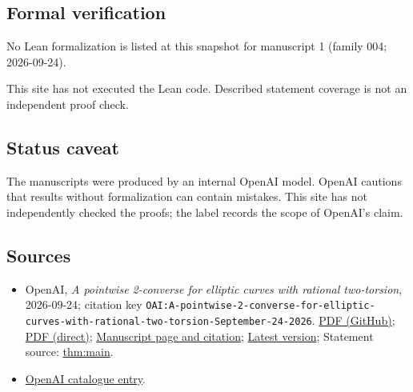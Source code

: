 \documentclass[11pt]{article}
\begin{document}
\subsection{Formal verification}
No Lean formalization is listed at this snapshot for manuscript 1 (family 004; 2026-09-24).

This site has not executed the Lean code. Described statement coverage is not an independent proof check.

\subsection{Status caveat}
The manuscripts were produced by an internal OpenAI model. OpenAI cautions that results without formalization can contain mistakes. This site has not independently checked the proofs; the label records the scope of OpenAI's claim.

\subsection{Sources}
\begin{itemize}
\item OpenAI, \emph{A pointwise 2-converse for elliptic curves with rational two-torsion}, 2026-09-24; citation key \texttt{OAI:A-pointwise-2-converse-for-elliptic-curves-with-rational-two-torsion-September-24-2026}. \href{https://github.com/openai/math/blob/adc7f1241b42e322a6451854ab7e4b4c146bf78a/preprints/A-pointwise-2-converse-for-elliptic-curves-with-rational-two-torsion-September-24-2026/paper.pdf}{PDF (GitHub)}; \href{https://github.com/openai/math/raw/adc7f1241b42e322a6451854ab7e4b4c146bf78a/preprints/A-pointwise-2-converse-for-elliptic-curves-with-rational-two-torsion-September-24-2026/paper.pdf}{PDF (direct)}; \href{https://github.com/openai/math/blob/adc7f1241b42e322a6451854ab7e4b4c146bf78a/preprints/A-pointwise-2-converse-for-elliptic-curves-with-rational-two-torsion-September-24-2026/README.md}{Manuscript page and citation}; \href{https://github.com/openai/math/blob/main/preprints/A-pointwise-2-converse-for-elliptic-curves-with-rational-two-torsion-September-24-2026/paper.pdf}{Latest version}; Statement source: \href{https://github.com/openai/math/blob/adc7f1241b42e322a6451854ab7e4b4c146bf78a/preprints/A-pointwise-2-converse-for-elliptic-curves-with-rational-two-torsion-September-24-2026/build/sections/introduction.tex\#L22}{thm:main}.
\item \href{https://github.com/openai/math/blob/adc7f1241b42e322a6451854ab7e4b4c146bf78a/CONTENTS.md}{OpenAI catalogue entry}.
\end{itemize}
\end{document}
